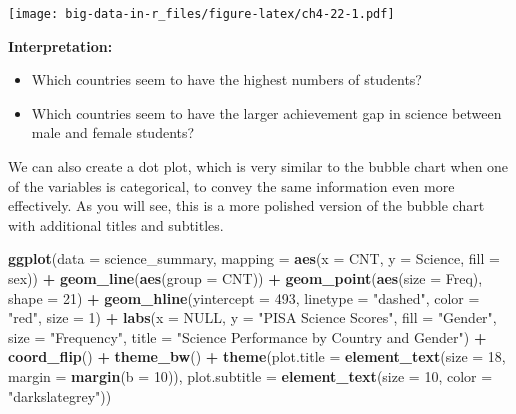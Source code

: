 \documentclass[]{book}
\newenvironment{Shaded}{\begin{snugshade}}{\end{snugshade}}
\newcommand{\DataTypeTok}[1]{\textcolor[rgb]{0.13,0.29,0.53}{#1}}
\newcommand{\DecValTok}[1]{\textcolor[rgb]{0.00,0.00,0.81}{#1}}
\newcommand{\KeywordTok}[1]{\textcolor[rgb]{0.13,0.29,0.53}{\textbf{#1}}}
\newcommand{\NormalTok}[1]{#1}
\newcommand{\OperatorTok}[1]{\textcolor[rgb]{0.81,0.36,0.00}{\textbf{#1}}}
\newcommand{\OtherTok}[1]{\textcolor[rgb]{0.56,0.35,0.01}{#1}}
\newcommand{\StringTok}[1]{\textcolor[rgb]{0.31,0.60,0.02}{#1}}
\providecommand{\tightlist}{%
  \setlength{\itemsep}{0pt}\setlength{\parskip}{0pt}}
\begin{document}
\texttt{[image: big-data-in-r\_files/figure-latex/ch4-22-1.pdf]}

\textbf{Interpretation:}

\begin{itemize}
\tightlist
\item
  Which countries seem to have the highest numbers of students?
\item
  Which countries seem to have the larger achievement gap in science between male and female students?
\end{itemize}

We can also create a dot plot, which is very similar to the bubble chart when one of the variables is categorical, to convey the same information even more effectively. As you will see, this is a more polished version of the bubble chart with additional titles and subtitles.

\begin{Shaded}
\begin{Highlighting}[]
\KeywordTok{ggplot}\NormalTok{(}\DataTypeTok{data =}\NormalTok{ science_summary, }\DataTypeTok{mapping =} \KeywordTok{aes}\NormalTok{(}\DataTypeTok{x =}\NormalTok{ CNT, }\DataTypeTok{y =}\NormalTok{ Science, }\DataTypeTok{fill =}\NormalTok{ sex)) }\OperatorTok{+}\StringTok{ }
\StringTok{    }\KeywordTok{geom_line}\NormalTok{(}\KeywordTok{aes}\NormalTok{(}\DataTypeTok{group =}\NormalTok{ CNT)) }\OperatorTok{+}\StringTok{ }\KeywordTok{geom_point}\NormalTok{(}\KeywordTok{aes}\NormalTok{(}\DataTypeTok{size =}\NormalTok{ Freq), }\DataTypeTok{shape =} \DecValTok{21}\NormalTok{) }\OperatorTok{+}\StringTok{ }
\StringTok{    }\KeywordTok{geom_hline}\NormalTok{(}\DataTypeTok{yintercept =} \DecValTok{493}\NormalTok{, }\DataTypeTok{linetype =} \StringTok{"dashed"}\NormalTok{, }\DataTypeTok{color =} \StringTok{"red"}\NormalTok{, }\DataTypeTok{size =} \DecValTok{1}\NormalTok{) }\OperatorTok{+}\StringTok{ }
\StringTok{    }\KeywordTok{labs}\NormalTok{(}\DataTypeTok{x =} \OtherTok{NULL}\NormalTok{, }\DataTypeTok{y =} \StringTok{"PISA Science Scores"}\NormalTok{, }\DataTypeTok{fill =} \StringTok{"Gender"}\NormalTok{, }\DataTypeTok{size =} \StringTok{"Frequency"}\NormalTok{, }
        \DataTypeTok{title =} \StringTok{"Science Performance by Country and Gender"}\NormalTok{) }\OperatorTok{+}\StringTok{ }\KeywordTok{coord_flip}\NormalTok{() }\OperatorTok{+}\StringTok{ }
\StringTok{    }\KeywordTok{theme_bw}\NormalTok{() }\OperatorTok{+}\StringTok{ }\KeywordTok{theme}\NormalTok{(}\DataTypeTok{plot.title =} \KeywordTok{element_text}\NormalTok{(}\DataTypeTok{size =} \DecValTok{18}\NormalTok{, }\DataTypeTok{margin =} \KeywordTok{margin}\NormalTok{(}\DataTypeTok{b =} \DecValTok{10}\NormalTok{)), }
    \DataTypeTok{plot.subtitle =} \KeywordTok{element_text}\NormalTok{(}\DataTypeTok{size =} \DecValTok{10}\NormalTok{, }\DataTypeTok{color =} \StringTok{"darkslategrey"}\NormalTok{))}
\end{Highlighting}
\end{Shaded}
\end{document}
